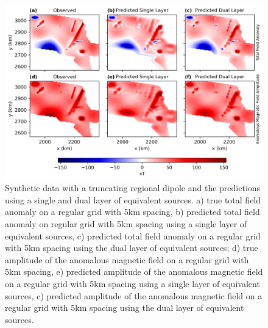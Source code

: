 \begin{figure}[tb!]
\centering
\includegraphics[width=1\linewidth]{paper/figures/truncated_regional.png}
\caption{
    Synthetic data with a truncating regional dipole and the predictions using a single and dual layer of equivalent sources. a) true total field anomaly on a regular grid with 5km spacing, b) predicted total field anomaly on regular grid with 5km spacing using a single layer of equivalent sources, c) predicted total field anomaly on a regular grid with 5km spacing using the dual layer of equivalent sources; d) true amplitude of the anomalous magnetic field on a regular grid with 5km spacing, e) predicted amplitude of the anomalous magnetic field on a regular grid with 5km spacing using a single layer of equivalent sources, c) predicted amplitude of the anomalous magnetic field on a regular grid with 5km spacing using the dual layer of equivalent sources.
}
\label{fig:truncated_regional}
\end{figure}

